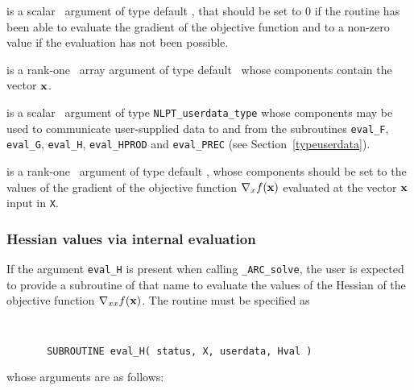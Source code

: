 \documentclass{galahad}
\newcommand{\packagename}{ARC}
\newcommand{\fullpackagename}{\libraryname\_\packagename}
\newcommand{\solver}{{\tt \fullpackagename\_solve}}
\begin{document}
\begin{description}
 is a scalar \intentout\ argument of type default \integer,
that should be set to 0 if the routine has been able to evaluate
the gradient of the objective function
and to a non-zero value if the evaluation has not been possible.

 is a rank-one \intentin\ array argument of type default \realdp\
whose components contain the vector ${\mathbf{x}}$.

 is a scalar \intentinout\ argument of type
{\tt NLPT\_userdata\_type} whose components may be used
to communicate user-supplied data to and from the
subroutines {\tt eval\_F}, {\tt eval\_G},
{\tt eval\_H}, {\tt eval\_HPROD} and {\tt eval\_PREC}
(see Section~\ref{typeuserdata}).

 is a rank-one \intentout\ argument of type default \realdp,
whose components should be set to the values of the gradient
of the objective function $\nabla_x f({\mathbf{x}})$
evaluated at the vector ${\mathbf{x}}$ input in {\tt X}.

\end{description}


\subsubsection{Hessian values via internal evaluation\label{hfv}}

If the argument {\tt eval\_H} is present when calling \solver, the
user is expected to provide a subroutine of that name to evaluate the
values of the Hessian of the objective function $\nabla_{xx} f({\mathbf{x}})$.
The routine must be specified as

\def\baselinestretch{0.8}
{\tt
\begin{verbatim}
       SUBROUTINE eval_H( status, X, userdata, Hval )
\end{verbatim} }
\def\baselinestretch{1.0}
\noindent whose arguments are as follows:
\end{document}
